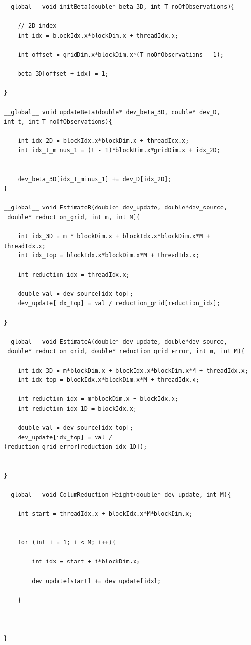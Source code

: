 \documentclass[english, paper=a4]{scrartcl}
\begin{document}
\begin{verbatim}
__global__ void initBeta(double* beta_3D, int T_noOfObservations){

	// 2D index
	int idx = blockIdx.x*blockDim.x + threadIdx.x;

	int offset = gridDim.x*blockDim.x*(T_noOfObservations - 1);

	beta_3D[offset + idx] = 1;

}

__global__ void updateBeta(double* dev_beta_3D, double* dev_D, 
int t, int T_noOfObservations){

	int idx_2D = blockIdx.x*blockDim.x + threadIdx.x;
	int idx_t_minus_1 = (t - 1)*blockDim.x*gridDim.x + idx_2D;


	dev_beta_3D[idx_t_minus_1] += dev_D[idx_2D];
}

__global__ void EstimateB(double* dev_update, double*dev_source,
 double* reduction_grid, int m, int M){

	int idx_3D = m * blockDim.x + blockIdx.x*blockDim.x*M + threadIdx.x;
	int idx_top = blockIdx.x*blockDim.x*M + threadIdx.x;

	int reduction_idx = threadIdx.x;

	double val = dev_source[idx_top];
	dev_update[idx_top] = val / reduction_grid[reduction_idx];

}

__global__ void EstimateA(double* dev_update, double*dev_source,
 double* reduction_grid, double* reduction_grid_error, int m, int M){

	int idx_3D = m*blockDim.x + blockIdx.x*blockDim.x*M + threadIdx.x;
	int idx_top = blockIdx.x*blockDim.x*M + threadIdx.x;

	int reduction_idx = m*blockDim.x + blockIdx.x;
	int reduction_idx_1D = blockIdx.x;

	double val = dev_source[idx_top];
	dev_update[idx_top] = val / (reduction_grid_error[reduction_idx_1D]);


}

__global__ void ColumReduction_Height(double* dev_update, int M){

	int start = threadIdx.x + blockIdx.x*M*blockDim.x;


	for (int i = 1; i < M; i++){

		int idx = start + i*blockDim.x;

		dev_update[start] += dev_update[idx];

	}



}


\end{verbatim}
\end{document}
